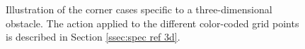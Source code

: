 \begin{figure}[h]
    
    
    
    
    
    
    
    
    
			
	
	
\caption{Illustration of the corner cases specific to a three-dimensional obstacle. The action applied to the different color-coded grid points is described in Section \ref{ssec:spec ref 3d}.}\label{fig:3dpict}
\end{figure}

